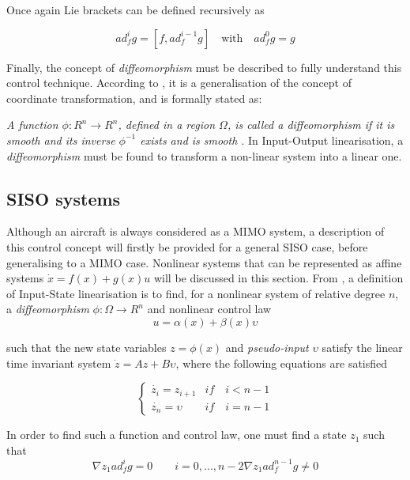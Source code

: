 Once again Lie brackets can be defined recursively as

\begin{equation}
ad_f^ig=[f, ad_f^{i-1}g] \quad \text{with} \quad ad_f^0g=g
\end{equation}

Finally, the concept of \emph{diffeomorphism} must be described to fully understand this control technique. According to \cite{Slotine+Li}, it is a generalisation of the concept of coordinate transformation, and is formally stated as:

\emph{A function $\phi: R^n\rightarrow R^n$, defined in a region $\Omega$, is called a diffeomorphism if it is smooth and its inverse $\phi^{-1}$ exists and is smooth \cite{Slotine+Li}}. 
In Input-Output linearisation, a \emph{diffeomorphism} must be found to transform a non-linear system into a linear one.
\subsection{SISO systems}
\label{section:background/SISO_NLI}

Although an aircraft is always considered as a MIMO system, a description of this control concept will firstly be provided for a general SISO case, before generalising to a MIMO case. Nonlinear systems that can be represented as affine systems $\dot{x}=f(x)+g(x)u$ will be discussed in this section. From \cite{Slotine+Li}, a definition of Input-State linearisation is to find, for a nonlinear system of relative degree $n$, a \emph{diffeomorphism} $\phi:\Omega \rightarrow R^n$ and nonlinear control law
\begin{equation}
u=\alpha(x) + \beta(x)\upsilon
\label{eq:nli_control_law}
\end{equation}

such that the new state variables $z=\phi(x)$ and \emph{pseudo-input} $\upsilon$ satisfy the linear time invariant system $\dot{z} = Az+B\upsilon$, where the following equations are satisfied

\begin{equation}
	\begin{cases}
		\dot{z_i}=z_{i+1} & if\quad i<n-1\\
		\dot{z_n}=\upsilon & if\quad i=n-1
	\end{cases}
	\label{eq:SISO_state}
\end{equation}

In order to find such a function and control law, one must find a state $z_1$ such that 
\begin{subequations}
	\begin{equation}
		\nabla z_1 ad_f^ig=0 \qquad i=0, ..., n-2
	\end{equation}
	\begin{equation}
		\nabla z_1 ad_f^{n-1}g\neq 0
	\end{equation}
\end{subequations}

